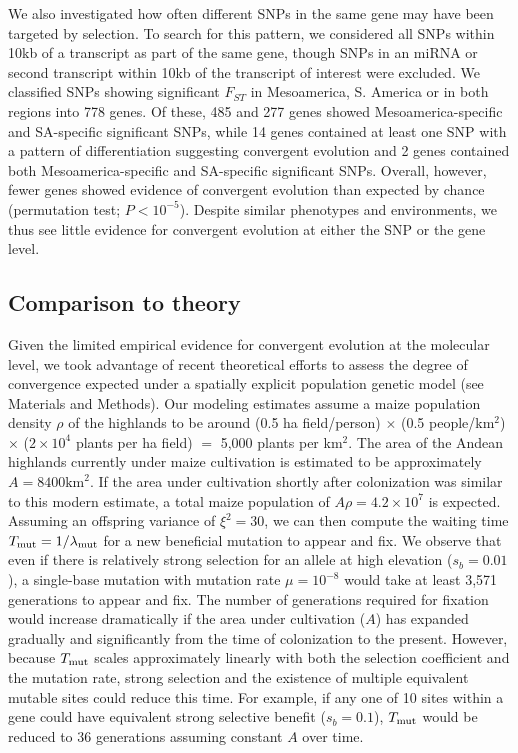 We also investigated how often different SNPs in the same gene may have been targeted by selection. 
To search for this pattern, we considered all SNPs within 10kb of a transcript as part of the same gene, though SNPs in an miRNA or second transcript within 10kb of the transcript of interest were excluded.  
We classified SNPs showing significant $F_{ST}$ in Mesoamerica, S. America or in both regions into 778 genes. 
Of these, 485 and 277 genes showed Mesoamerica-specific and SA-specific significant SNPs, while 14 genes contained at least one SNP with a pattern of differentiation suggesting convergent evolution and 2 genes contained both Mesoamerica-specific and SA-specific significant SNPs. 
Overall, however, fewer genes showed evidence of convergent evolution than expected by chance (permutation test; $P<10^{-5}$). 
Despite similar phenotypes and environments, we thus see little evidence for convergent evolution at either the SNP or the gene level.  

\subsection*{Comparison to theory}


Given the limited empirical evidence for convergent evolution at the molecular level, we took advantage of recent theoretical efforts \cite[]{ralph2014convergent} to assess the degree of convergence expected under a spatially explicit population genetic model (see Materials and Methods).
Our modeling estimates assume a maize population density $\rho$ of the highlands to be around (0.5 ha field/person) $\times$ (0.5 people/km$^2$) $\times$ ($2\times 10^4$ plants per ha field) $=$ 5,000 plants per km$^2$.
The area of the Andean highlands currently under maize cultivation is estimated to be approximately $A=8400\text{km}^2$.  If the area under cultivation shortly after colonization was similar to this modern estimate, a total maize population of $A \rho = 4.2 \times 10^7$ is expected. %
Assuming an offspring variance of $\xi^2 = 30$, we can then compute the waiting time $T_{\text{mut}}=1/\lambda_{\text{mut}}$ for a new beneficial mutation to appear and fix.
We observe that even if there is relatively strong selection for an allele at high elevation ($s_b=0.01$), a single-base mutation with mutation rate $\mu=10^{-8}$ would take at least 3,571 generations to appear and fix.
The number of generations required for fixation would increase dramatically if the area under cultivation ($A$) has expanded gradually and significantly from the time of colonization to the present.
However, because $T_{\text{mut}}$ scales approximately linearly with both the selection coefficient and the mutation rate, strong selection and the existence of multiple equivalent mutable sites could reduce this time. 
For example, if any one of 10 sites within a gene could have equivalent strong selective benefit ($s_b=0.1$), $T_{\text{mut}}$ would be reduced to 36 generations assuming constant $A$ over time. 

